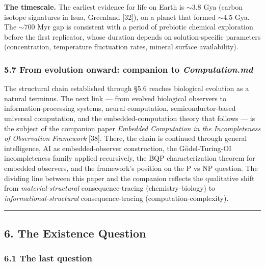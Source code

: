 \documentclass[
]{article}
\begin{document}
\textbf{The timescale.} The earliest evidence for life on Earth is
\(\sim 3.8\) Gya (carbon isotope signatures in Isua, Greenland
{[}32{]}), on a planet that formed \(\sim 4.5\) Gya. The \(\sim 700\)
Myr gap is consistent with a period of prebiotic chemical exploration
before the first replicator, whose duration depends on solution-specific
parameters (concentration, temperature fluctuation rates, mineral
surface availability).

\hypertarget{from-evolution-onward-companion-to-computation.md}{%
\subsubsection{\texorpdfstring{5.7 From evolution onward: companion to
\emph{Computation.md}}{5.7 From evolution onward: companion to Computation.md}}\label{from-evolution-onward-companion-to-computation.md}}

The structural chain established through §5.6 reaches biological
evolution as a natural terminus. The next link --- from evolved
biological observers to information-processing systems, neural
computation, semiconductor-based universal computation, and the
embedded-computation theory that follows --- is the subject of the
companion paper \emph{Embedded Computation in the Incompleteness of
Observation Framework} {[}38{]}. There, the chain is continued through
general intelligence, AI as embedded-observer construction, the
Gödel-Turing-OI incompleteness family applied recursively, the BQP
characterization theorem for embedded observers, and the framework's
position on the P vs NP question. The dividing line between this paper
and the companion reflects the qualitative shift from
\emph{material-structural} consequence-tracing (chemistry-biology) to
\emph{informational-structural} consequence-tracing
(computation-complexity).

\begin{center}\rule{0.5\linewidth}{0.5pt}\end{center}

\hypertarget{the-existence-question}{%
\subsection{6. The Existence Question}\label{the-existence-question}}

\hypertarget{the-last-question}{%
\subsubsection{6.1 The last question}\label{the-last-question}}
\end{document}
